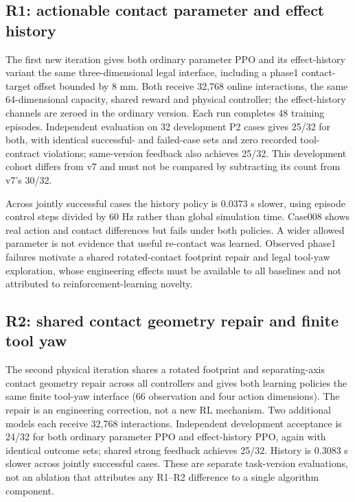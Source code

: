 \subsection{R1: actionable contact parameter and effect history}
The first new iteration gives both ordinary parameter PPO and its effect-history variant the same three-dimensional legal interface, including a phase1 contact-target offset bounded by 8 mm. Both receive 32,768 online interactions, the same 64-dimensional capacity, shared reward and physical controller; the effect-history channels are zeroed in the ordinary version. Each run completes 48 training episodes. Independent evaluation on 32 development P2 cases gives 25/32 for both, with identical successful- and failed-case sets and zero recorded tool-contract violations; same-version feedback also achieves 25/32. This development cohort differs from v7 and must not be compared by subtracting its count from v7's 30/32.

Across jointly successful cases the history policy is 0.0373 s slower, using episode control steps divided by 60 Hz rather than global simulation time. Case008 shows real action and contact differences but fails under both policies. A wider allowed parameter is not evidence that useful re-contact was learned. Observed phase1 failures motivate a shared rotated-contact footprint repair and legal tool-yaw exploration, whose engineering effects must be available to all baselines and not attributed to reinforcement-learning novelty.


\subsection{R2: shared contact geometry repair and finite tool yaw}
The second physical iteration shares a rotated footprint and separating-axis contact geometry repair across all controllers and gives both learning policies the same finite tool-yaw interface (66 observation and four action dimensions). The repair is an engineering correction, not a new RL mechanism. Two additional models each receive 32,768 interactions. Independent development acceptance is 24/32 for both ordinary parameter PPO and effect-history PPO, again with identical outcome sets; shared strong feedback achieves 25/32. History is 0.3083 s slower across jointly successful cases. These are separate task-version evaluations, not an ablation that attributes any R1--R2 difference to a single algorithm component.

